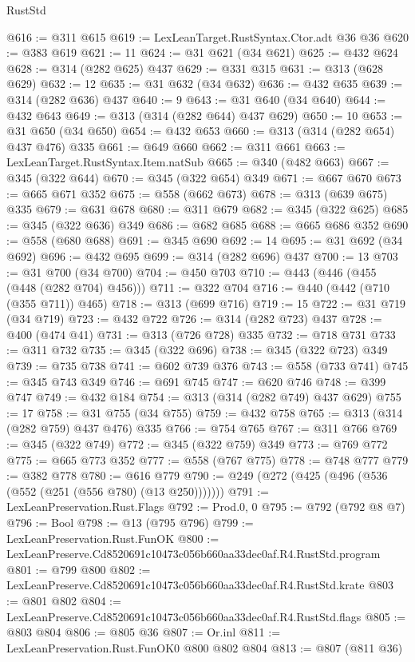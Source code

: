 \begin{lexlean}{RustStd}
\begin{coremodule}
@616 := @311 @615
@619 := LexLeanTarget.RustSyntax.Ctor.adt @36 @36
@620 := @383 @619
@621 := 11
@624 := @31 @621 (@34 @621)
@625 := @432 @624
@628 := @314 (@282 @625) @437
@629 := @331 @315
@631 := @313 (@628 @629)
@632 := 12
@635 := @31 @632 (@34 @632)
@636 := @432 @635
@639 := @314 (@282 @636) @437
@640 := 9
@643 := @31 @640 (@34 @640)
@644 := @432 @643
@649 := @313 (@314 (@282 @644) @437 @629)
@650 := 10
@653 := @31 @650 (@34 @650)
@654 := @432 @653
@660 := @313 (@314 (@282 @654) @437 @476) @335
@661 := @649 @660
@662 := @311 @661
@663 := LexLeanTarget.RustSyntax.Item.natSub
@665 := @340 (@482 @663)
@667 := @345 (@322 @644)
@670 := @345 (@322 @654) @349
@671 := @667 @670
@673 := @665 @671 @352
@675 := @558 (@662 @673)
@678 := @313 (@639 @675) @335
@679 := @631 @678
@680 := @311 @679
@682 := @345 (@322 @625)
@685 := @345 (@322 @636) @349
@686 := @682 @685
@688 := @665 @686 @352
@690 := @558 (@680 @688)
@691 := @345 @690
@692 := 14
@695 := @31 @692 (@34 @692)
@696 := @432 @695
@699 := @314 (@282 @696) @437
@700 := 13
@703 := @31 @700 (@34 @700)
@704 := @450 @703
@710 := @443 (@446 (@455 (@448 (@282 @704) @456)))
@711 := @322 @704
@716 := @440 (@442 (@710 (@355 @711)) @465)
@718 := @313 (@699 @716)
@719 := 15
@722 := @31 @719 (@34 @719)
@723 := @432 @722
@726 := @314 (@282 @723) @437
@728 := @400 (@474 @41)
@731 := @313 (@726 @728) @335
@732 := @718 @731
@733 := @311 @732
@735 := @345 (@322 @696)
@738 := @345 (@322 @723) @349
@739 := @735 @738
@741 := @602 @739 @376
@743 := @558 (@733 @741)
@745 := @345 @743 @349
@746 := @691 @745
@747 := @620 @746
@748 := @399 @747
@749 := @432 @184
@754 := @313 (@314 (@282 @749) @437 @629)
@755 := 17
@758 := @31 @755 (@34 @755)
@759 := @432 @758
@765 := @313 (@314 (@282 @759) @437 @476) @335
@766 := @754 @765
@767 := @311 @766
@769 := @345 (@322 @749)
@772 := @345 (@322 @759) @349
@773 := @769 @772
@775 := @665 @773 @352
@777 := @558 (@767 @775)
@778 := @748 @777
@779 := @382 @778
@780 := @616 @779
@790 := @249 (@272 (@425 (@496 (@536 (@552 (@251 (@556 @780) (@13 @250)))))))
@791 := LexLeanPreservation.Rust.Flags
@792 := Prod.{0, 0}
@795 := @792 (@792 @8 @7)
@796 := Bool
@798 := @13 (@795 @796)
@799 := LexLeanPreservation.Rust.FunOK
@800 := LexLeanPreserve.Cd8520691c10473c056b660aa33dec0af.R4.RustStd.program
@801 := @799 @800
@802 := LexLeanPreserve.Cd8520691c10473c056b660aa33dec0af.R4.RustStd.krate
@803 := @801 @802
@804 := LexLeanPreserve.Cd8520691c10473c056b660aa33dec0af.R4.RustStd.flags
@805 := @803 @804
@806 := @805 @36
@807 := Or.inl
@811 := LexLeanPreservation.Rust.FunOK0 @800 @802 @804
@813 := @807 (@811 @36)

\end{coremodule}
\end{lexlean}
